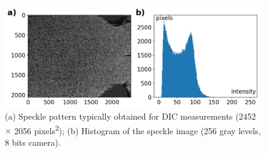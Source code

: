 \begin{figure}[t]
	\centering
	\includegraphics[width=.9\textwidth]{Figures/SpecklePattern}
	\decoRule
	\caption{(a) Speckle pattern typically obtained for DIC measurements (2452 $\times$ 2056
		pixels\textsuperscript{2}); (b) Histogram
		of the
		speckle image
		(256
		gray levels, 8 bits camera).}
	\label{fig:Fig17}
\end{figure}



